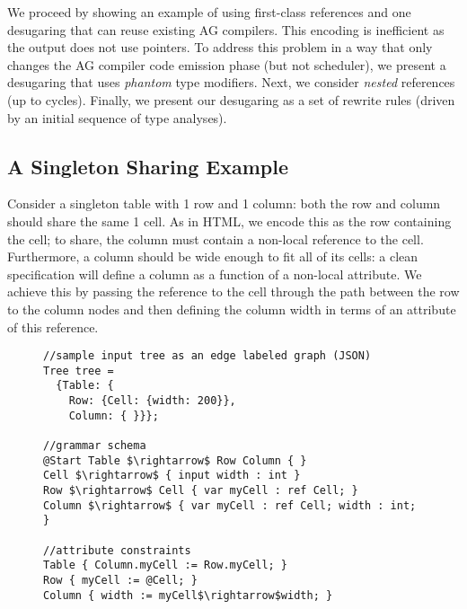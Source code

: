 


We proceed by showing an example of using first-class references and one desugaring that can reuse existing AG compilers. This encoding is inefficient as the output does not use pointers. To address this problem in a way that only changes the AG compiler code emission phase (but not scheduler), we present a desugaring that uses \emph{phantom} type modifiers. Next, we consider \emph{nested} references (up to cycles). Finally, we present our desugaring as a set of rewrite rules (driven by an initial sequence of type analyses).

\subsection{A Singleton Sharing Example}

Consider a singleton table with 1 row and 1 column: both the row and column should share the same 1 cell. As in HTML, we encode this as the row containing the cell; to share, the column must contain a non-local reference to the cell. Furthermore, a column should be wide enough to fit all of its cells: a clean specification will define a column as a function of a non-local attribute. We achieve this by passing the reference to the cell through the path between the row to the column nodes and then defining the column width in terms of an attribute of this reference.

\begin{figure}
\begin{lstlisting}[mathescape]
//sample input tree as an edge labeled graph (JSON)
Tree tree = 
  {Table: {
    Row: {Cell: {width: 200}},
    Column: { }}};
    
//grammar schema
@Start Table $\rightarrow$ Row Column { }
Cell $\rightarrow$ { input width : int }
Row $\rightarrow$ Cell { var myCell : ref Cell; }
Column $\rightarrow$ { var myCell : ref Cell; width : int; }

//attribute constraints
Table { Column.myCell := Row.myCell; }
Row { myCell := @Cell; }
Column { width := myCell$\rightarrow$width; }
\end{lstlisting}
\end{figure}

